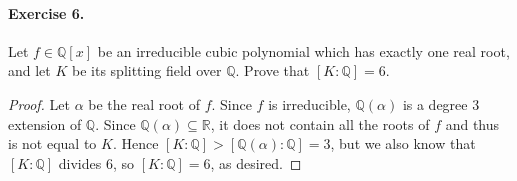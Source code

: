 \documentclass{article}
\newcommand{\Q}{\mathbb Q}
\begin{document}
\paragraph{Exercise 6.} Let $f\in \Q[x]$ be an irreducible cubic polynomial which has exactly one real root, and let $K$ be its splitting field over $\mathbb Q$. Prove that $[K:\Q]=6$. 

\begin{proof}
Let $\alpha$ be the real root of $f$. Since $f$ is irreducible, $\Q(\alpha)$ is a degree 3 extension of $\Q$. Since $\Q(\alpha)\subseteq \mathbb R$, it does not contain all the roots of $f$ and thus is not equal to $K$. Hence $[K:\Q]>[\Q(\alpha):\Q]=3$, but we also know that $[K:\Q]$ divides 6, so $[K:\Q]=6$, as desired. 
\end{proof}
\end{document}
